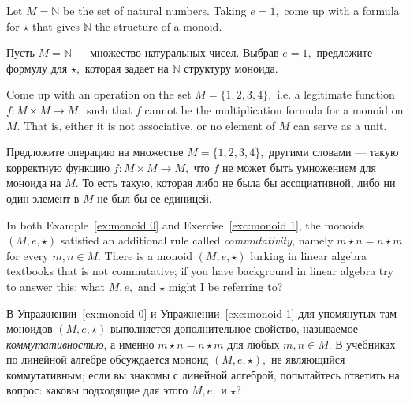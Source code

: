 \documentclass[../main/CT4S-EN-RU]{subfiles}
\begin{document}
\begin{exerciseENG}\label{exc:monoid 1}
Let $M={ℕ}$ be the set of natural numbers. Taking $e=1,$ come up with a formula for ${⋆}$ that gives ${ℕ}$ the structure of a monoid.
\end{exerciseENG}

\begin{exerciseRUS}\label{exc:monoid 1}
Пусть $M={ℕ}$ — множество натуральных чисел. Выбрав $e=1,$ предложите формулу для ${⋆},$ которая задает на ${ℕ}$ структуру моноида.
\end{exerciseRUS}

\begin{exerciseENG}
Come up with an operation on the set $M=\{1,2,3,4\},$ i.e. a legitimate function $f\colon M\times M{→} M,$ such that $f$ cannot be the multiplication formula for a monoid on $M.$ That is, either it is not associative, or no element of $M$ can serve as a unit.
\end{exerciseENG}

\begin{exerciseRUS}
Предложите операцию на множестве $M=\{1,2,3,4\},$ другими словами — такую корректную функцию $f\colon M\times M{→} M,$ что $f$ не может быть умножением для моноида на $M.$ То есть такую, которая либо не была бы ассоциативной, либо ни один элемент в $M$ не был бы ее единицей.
\end{exerciseRUS}

\begin{exerciseENG}\label{ex:commutative monoid}
In both Example~\ref{ex:monoid 0} and Exercise~\ref{exc:monoid 1}, the monoids $(M,e,{⋆})$ satisfied an additional rule called {\em commutativity}, namely $m{⋆} n=n{⋆} m$ for every $m,n\in M.$ There is a monoid $(M,e,{⋆})$ lurking in linear algebra textbooks that is not commutative; if you have background in linear algebra try to answer this: what $M, e,$ and ${⋆}$ might I be referring to?
\end{exerciseENG}

\begin{exerciseRUS}\label{ex:commutative monoid}
В Упражнении~\ref{ex:monoid 0} и Упражнении~\ref{exc:monoid 1} для упомянутых там моноидов $(M,e,{⋆})$ выполняется дополнительное свойство, называемое {\em коммутативностью}, а именно $m{⋆} n=n{⋆} m$ для любых $m,n\in M.$ В учебниках по линейной алгебре обсуждается моноид $(M,e,{⋆}),$ не являющийся коммутативным; если вы знакомы с линейной алгеброй, попытайтесь ответить на вопрос: каковы подходящие для этого $M, e,$ и ${⋆}$?
\end{exerciseRUS}
\end{document}
